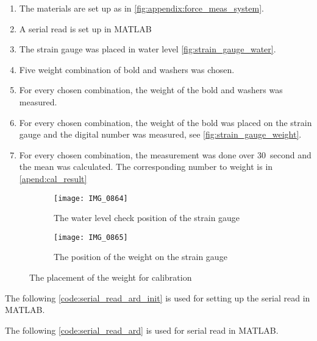 \begin{enumerate}
\item The materials are set up as in \autoref{fig:appendix:force_meas_system}.
\item A serial read is set up in MATLAB
\item The strain gauge was placed in water level \autoref{fig:strain_gauge_water}.
\item  Five weight combination of bold and washers was chosen.
\item  For every chosen combination, the weight of the bold and washers was measured.
\item For every chosen combination, the weight of the bold was placed on the strain gauge and the digital number was measured, see \autoref{fig:strain_gauge_weight}. 
\item For every chosen combination, the measurement was done over \SI{30}{second} and the mean was calculated. The corresponding number to weight is in \autoref{apend:cal_result}
\end{enumerate}

\begin{figure}[H]
\centering
\begin{subfigure}[htbp]{0.45\textwidth}
		\texttt{[image: IMG\_0864]}
		\caption{The water level check position of the strain gauge}
		\label{fig:strain_gauge_water}
\end{subfigure}\vspace{10pt}
\begin{subfigure}[htbp]{0.45\textwidth}
		\texttt{[image: IMG\_0865]}
		\caption{The position of the weight on the strain gauge}
		\label{fig:strain_gauge_weight}
\end{subfigure} \hspace{10pt}
\caption{The placement of the weight for calibration}
\label{fig:bc_holder}
\end{figure}


The following \autoref{code:serial_read_ard_init} is used for setting up the serial read in MATLAB.


The following \autoref{code:serial_read_ard} is used for serial read in MATLAB.


